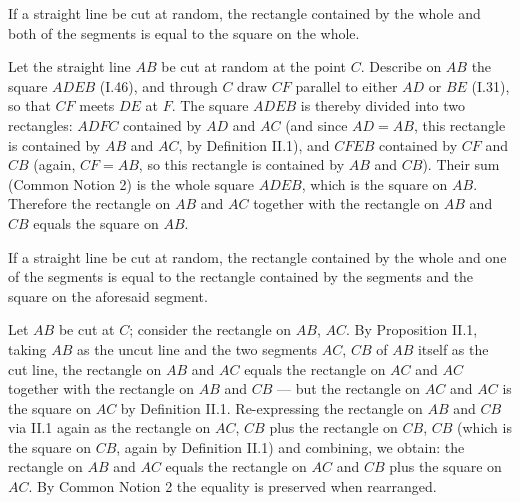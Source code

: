 \documentclass{rrxiv}
\begin{document}
\begin{claim}
\label{prop:II.2}
If a straight line be cut at random, the rectangle contained by the
whole and both of the segments is equal to the square on the whole.
\end{claim}
\begin{evidence}[Proof of II.2]
\label{ev:II.2}
Let the straight line $AB$ be cut at random at the point $C$.
Describe on $AB$ the square $ADEB$ (I.46), and through $C$ draw
$CF$ parallel to either $AD$ or $BE$ (I.31), so that $CF$ meets $DE$
at $F$.  The square $ADEB$ is thereby divided into two rectangles:
$ADFC$ contained by $AD$ and $AC$ (and since $AD = AB$, this rectangle
is contained by $AB$ and $AC$, by Definition II.1), and $CFEB$
contained by $CF$ and $CB$ (again, $CF = AB$, so this rectangle is
contained by $AB$ and $CB$).  Their sum (Common Notion 2) is the
whole square $ADEB$, which is the square on $AB$.  Therefore the
rectangle on $AB$ and $AC$ together with the rectangle on $AB$ and
$CB$ equals the square on $AB$.
\end{evidence}

\begin{claim}
\label{prop:II.3}
If a straight line be cut at random, the rectangle contained by the
whole and one of the segments is equal to the rectangle contained by
the segments and the square on the aforesaid segment.
\end{claim}
\begin{evidence}[Proof of II.3]
\label{ev:II.3}
Let $AB$ be cut at $C$; consider the rectangle on $AB$, $AC$.  By
Proposition II.1, taking $AB$ as the uncut line and the two segments
$AC$, $CB$ of $AB$ itself as the cut line, the rectangle on $AB$ and
$AC$ equals the rectangle on $AC$ and $AC$ together with the
rectangle on $AB$ and $CB$ --- but the rectangle on $AC$ and $AC$ is
the square on $AC$ by Definition II.1.  Re-expressing the rectangle
on $AB$ and $CB$ via II.1 again as the rectangle on $AC$, $CB$ plus
the rectangle on $CB$, $CB$ (which is the square on $CB$, again by
Definition II.1) and combining, we obtain:
the rectangle on $AB$ and $AC$ equals the rectangle on $AC$ and
$CB$ plus the square on $AC$.  By Common Notion 2 the equality is
preserved when rearranged.
\end{evidence}
\end{document}
